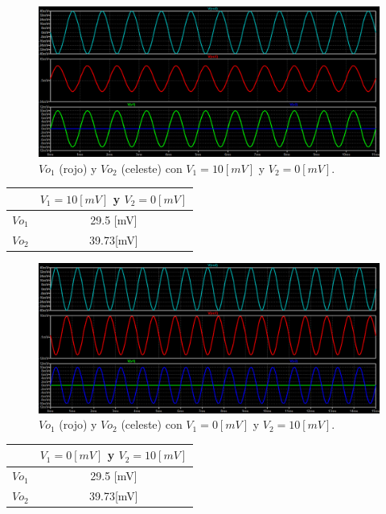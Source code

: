 \begin{figure}[H]
	\centering
	\includegraphics[width=1\textwidth]{figuras/Sim_V1=10mv_V2=0.png}
	\caption{$Vo_1$ (rojo) y $Vo_2$ (celeste) con $V_1=10[mV]$ y $V_2=0[mV]$.}
\end{figure}
\begin{center}
	\begin{tabular}{| c | c |}
	\hline
	   	& $V_1=10[mV]$ y $V_2=0[mV]$ \\ \hline
	$Vo_1$ 	&  	29.5 [mV]	 \\
	$Vo_2$ 	& 	39.73[mV]	 \\ \hline
\end{tabular}
	\end{center}

\begin{figure}[H]
	\centering
	\includegraphics[width=1\textwidth]{figuras/Sim_V1=0_V2=10mv.png}
	\caption{$Vo_1$ (rojo) y $Vo_2$ (celeste) con $V_1=0[mV]$ y $V_2=10[mV]$.}
\end{figure}
\begin{center}
	\begin{tabular}{| c | c |}
		\hline
		& $V_1=0[mV]$ y $V_2=10[mV]$ \\ \hline
		$Vo_1$ 	&  	29.5 [mV]	 \\
		$Vo_2$ 	& 	39.73[mV]	 \\ \hline
	\end{tabular}
\end{center}


